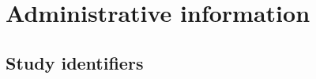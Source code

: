 \documentclass[
]{scrartcl}
\renewcommand*\contentsname{Table of contents}
\newcommand\contentsname{Table of contents}
\begin{document}
\begin{titlepage}
{{{\titlepagetitleblock}
}

\vspace{0.1\textheight}
}

\newcommand{\authorblock}{}

\newcommand{\affiliationblock}{}

\newcommand{\logoblock}{}

\newcommand{\footerblock}{}

\newcommand{\dateblock}{}

\newcommand{\headerblock}{}

\thispagestyle{empty} %


\newlength{\minipagewidth}
\setlength{\minipagewidth}{\textwidth}
\raggedright %
\begin{minipage}[b][\textheight][s]{\minipagewidth}
\titlepagepagealign
\titleblock

\authorblock

\vfill

\logoblock

\footerblock
\par

\end{minipage}
\clearpage
\end{titlepage}
\setcounter{page}{1}

\ifdefined\Shaded\renewenvironment{Shaded}{\begin{tcolorbox}[sharp corners, interior hidden, frame hidden, borderline west={3pt}{0pt}{shadecolor}, boxrule=0pt, breakable, enhanced]}{\end{tcolorbox}}\fi

\renewcommand*\contentsname{Table of contents}
{
\hypersetup{linkcolor=}
\setcounter{tocdepth}{3}
\tableofcontents
}
\newpage{}

\hypertarget{administrative-information}{%
\section{Administrative information}\label{administrative-information}}

\hypertarget{study-identifiers}{%
\subsection{Study identifiers}\label{study-identifiers}}
\end{document}
